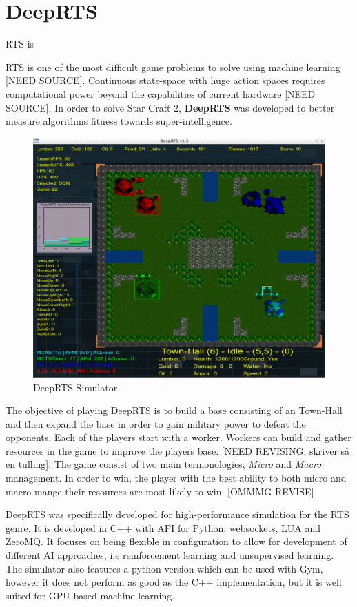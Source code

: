 \documentclass[fleqn,10pt]{article} %
\begin{document}
\section{DeepRTS}
RTS is 




RTS is one of the most difficult game problems to solve using machine learning [NEED SOURCE]. Continuous state-space with huge action spaces requires computational power beyond the capabilities of current hardware [NEED SOURCE]. In order to solve Star Craft 2, \textbf{DeepRTS} was developed to better measure algorithms fitness towards super-intelligence.

\begin{figure}[!htp]\centering
    \includegraphics[width=\linewidth]{deep_rts}
    \caption{DeepRTS Simulator}
    \label{fig:results}
\end{figure}

The objective of playing DeepRTS is to build a base consisting of an Town-Hall and then expand the base in order to gain military power to defeat the opponents. Each of the players start with a worker. Workers can build and gather resources in the game to improve the players base.   [NEED REVISING, skriver så en tulling]. The game consist of two main termonologies, \textit{Micro} and \textit{Macro} management. In order to win, the player with the best ability to both micro and macro mange their resources are most likely to win. [OMMMG REVISE]

DeepRTS was specifically developed for high-performance simulation for the RTS genre. It is developed in C++ with API for Python, websockets, LUA and ZeroMQ. It focuses on being flexible in configuration to allow for development of different AI approaches, i.e reinforcement learning and unsupervised learning. The simulator also features a python version which can be used with Gym, however it does not perform as good as the C++ implementation, but it is well suited for GPU based machine learning.
\end{document}
